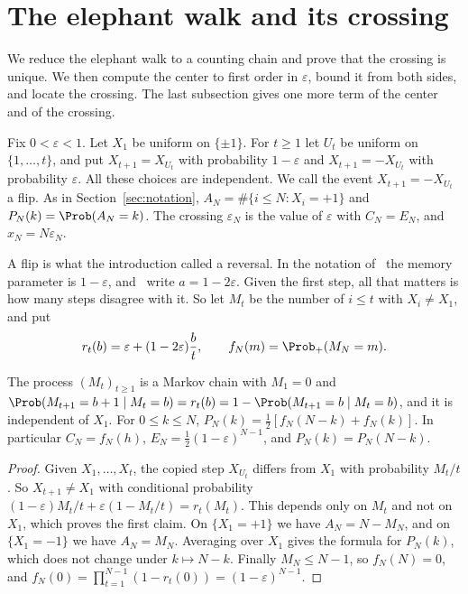 \section{The elephant walk and its crossing}\label{sec:erw}

We reduce the elephant walk to a counting chain and prove that the crossing is
unique. We then compute the center to first order in $\varepsilon$, bound it
from both sides, and locate the crossing. The last subsection gives one more term of the center
and of the crossing.

\begin{definition}\label{def:erw}
Fix $0<\varepsilon<1$. Let $X_1$ be uniform on $\{\pm1\}$. For $t\ge1$ let
$U_t$ be uniform on $\{1,\dots,t\}$, and put $X_{t+1}=X_{U_t}$ with
probability $1-\varepsilon$ and $X_{t+1}=-X_{U_t}$ with probability
$\varepsilon$. All these choices are independent. We call the event
$X_{t+1}=-X_{U_t}$ a flip. As in Section~\ref{sec:notation},
$A_N=\#\{i\le N:X_i=+1\}$ and $P_N(k)=\Prob(A_N=k)$. The crossing
$\varepsilon_N$ is the value of $\varepsilon$ with $C_N=E_N$, and
$x_N=N\varepsilon_N$.
\end{definition}

A flip is what the introduction called a reversal. In the notation
of~\cite{schutz2004} the memory parameter is $1-\varepsilon$,
and~\cite{glrs2025} write $a=1-2\varepsilon$. Given the first step, all that
matters is how many steps disagree with it. So let $M_t$ be the number of
$i\le t$ with $X_i\ne X_1$, and put
\[
 r_t(b)=\varepsilon+(1-2\varepsilon)\frac bt,\qquad f_N(m)=\Prob_+(M_N=m).
\]

\begin{lemma}\label{lem:erw-reduction}
The process $(M_t)_{t\ge1}$ is a Markov chain with $M_1=0$ and
$\Prob(M_{t+1}=b+1\mid M_t=b)=r_t(b)=1-\Prob(M_{t+1}=b\mid M_t=b)$, and it
is independent of $X_1$. For $0\le k\le N$,
$P_N(k)=\frac12[f_N(N-k)+f_N(k)]$. In particular $C_N=f_N(h)$,
$E_N=\frac12(1-\varepsilon)^{N-1}$, and $P_N(k)=P_N(N-k)$.
\end{lemma}

\begin{proof}
Given $X_1,\dots,X_t$, the copied step $X_{U_t}$ differs from $X_1$ with
probability $M_t/t$. So $X_{t+1}\ne X_1$ with conditional probability
$(1-\varepsilon)M_t/t+\varepsilon(1-M_t/t)=r_t(M_t)$. This depends only on
$M_t$ and not on $X_1$, which proves the first claim. On $\{X_1=+1\}$ we
have $A_N=N-M_N$, and on $\{X_1=-1\}$ we have $A_N=M_N$. Averaging over
$X_1$ gives the formula for $P_N(k)$, which does not change under
$k\mapsto N-k$. Finally $M_N\le N-1$, so $f_N(N)=0$, and
$f_N(0)=\prod_{t=1}^{N-1}(1-r_t(0))=(1-\varepsilon)^{N-1}$.
\end{proof}

